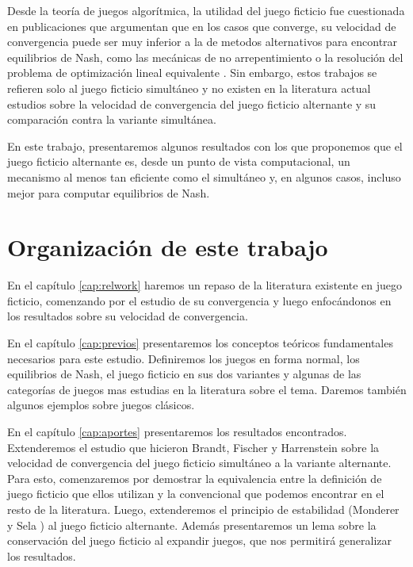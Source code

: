 Desde la teoría de juegos algorítmica, la utilidad del juego ficticio fue cuestionada en publicaciones que argumentan que en los casos que converge, su velocidad de convergencia puede ser muy inferior a la de metodos alternativos para encontrar equilibrios de Nash, como las mecánicas de no arrepentimiento o la resolución del problema de optimización lineal equivalente \cite{modified:fp:linear}. Sin embargo, estos trabajos se refieren solo al juego ficticio simultáneo y no existen en la literatura actual estudios sobre la velocidad de convergencia del juego ficticio alternante y su comparación contra la variante simultánea.

En este trabajo, presentaremos algunos resultados con los que proponemos que el juego ficticio alternante es, desde un punto de vista computacional, un mecanismo al menos tan eficiente como el simultáneo y, en algunos casos, incluso mejor para computar equilibrios de Nash.


\section{Organización de este trabajo}

 En el capítulo \ref{cap:relwork} haremos un repaso de la literatura existente en juego ficticio, comenzando por el estudio de su convergencia y luego enfocándonos en los resultados sobre su velocidad de convergencia. 
 
 En el capítulo \ref{cap:previos} presentaremos los conceptos teóricos fundamentales necesarios para este estudio. Definiremos los juegos en forma normal, los equilibrios de Nash, el juego ficticio en sus dos variantes y algunas de las categorías de juegos mas estudias en la literatura sobre el tema. Daremos también algunos ejemplos sobre juegos clásicos.

 En el capítulo \ref{cap:aportes} presentaremos los resultados encontrados. Extenderemos el estudio que hicieron Brandt, Fischer y Harrenstein \cite{brandt:rate:convergence} sobre la velocidad de convergencia del juego ficticio simultáneo a la variante alternante. Para esto, comenzaremos por demostrar la equivalencia entre la definición de juego ficticio que ellos utilizan y la convencional que podemos encontrar en el resto de la literatura. Luego, extenderemos el principio de estabilidad (Monderer y Sela \cite{no:cycling}) al juego ficticio alternante. Además presentaremos un lema sobre la conservación del juego ficticio al expandir juegos, que nos permitirá generalizar los resultados.